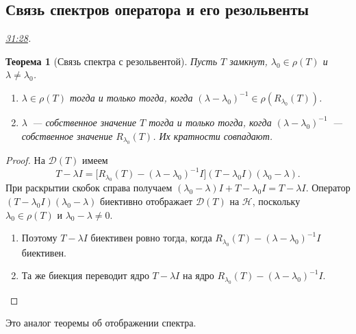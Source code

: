 \documentclass[11pt,a4paper]{article}
\theoremstyle{plain}
\newtheorem{theorem}{Теорема}[section]
\theoremstyle{definition}
\newcommand{\Hh}{\mathcal H}
\newcommand{\Dom}{\mathcal D}
\newcommand{\id}{I}
\newcommand{\at}[3]{\href{https://www.youtube.com/watch?v=#1&t=#2s}{#3}}
\newcommand{\topic}[2]{\Needspace{5\baselineskip}\subsection*{#1}\noindent\emph{#2.}\par\nobreak\smallskip}
\begin{document}
\topic{Связь спектров оператора и его резольвенты}{\at{pe5XWL9wtg4}{1888}{31:28}}
\begin{theorem}[Связь спектра с резольвентой]
\label{thm:resolvent-spectrum}
Пусть $T$ замкнут, $\lambda_0\in\rho(T)$ и $\lambda\ne\lambda_0$.
\begin{enumerate}
\item $\lambda\in\rho(T)$ тогда и только тогда, когда
  $(\lambda-\lambda_0)^{-1}\in\rho(R_{\lambda_0}(T))$.
\item $\lambda$~--- собственное значение $T$ тогда и только тогда,
  когда $(\lambda-\lambda_0)^{-1}$~--- собственное значение
  $R_{\lambda_0}(T)$. Их кратности совпадают.
\end{enumerate}
\end{theorem}
\begin{proof}
На $\Dom(T)$ имеем
\[
 T-\lambda\id=
 \bigl[R_{\lambda_0}(T)-(\lambda-\lambda_0)^{-1}\id\bigr]
 (T-\lambda_0\id)(\lambda_0-\lambda).
\]
При раскрытии скобок справа получаем
$(\lambda_0-\lambda)\id+T-\lambda_0\id=T-\lambda\id$.
Оператор $(T-\lambda_0\id)(\lambda_0-\lambda)$ биективно
отображает $\Dom(T)$ на $\Hh$, поскольку
$\lambda_0\in\rho(T)$ и $\lambda_0-\lambda\ne0$.
\begin{enumerate}
\item Поэтому $T-\lambda\id$ биективен ровно тогда, когда
  $R_{\lambda_0}(T)-(\lambda-\lambda_0)^{-1}\id$ биективен.
\item Та же биекция переводит ядро $T-\lambda\id$ на ядро
  $R_{\lambda_0}(T)-(\lambda-\lambda_0)^{-1}\id$.
\end{enumerate}
\end{proof}
Это аналог теоремы об отображении спектра.
\end{document}
